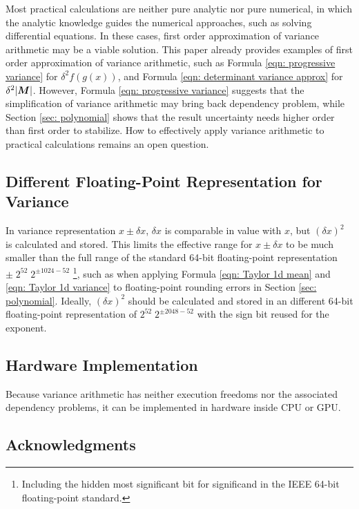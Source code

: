 \documentclass[twoside]{article}
\numberwithin{equation}{section}
\begin{document}
Most practical calculations are neither pure analytic nor pure numerical, in which the analytic knowledge guides the numerical approaches, such as solving differential equations.
In these cases, first order approximation of variance arithmetic may be a viable solution.
This paper already provides examples of first order approximation of variance arithmetic, such as Formula \eqref{eqn: progressive variance} for $\delta^2 f(g(x))$, and Formula \eqref{eqn: determinant variance approx} for $\delta^2 |\protect{\textrm{\boldmath $M$}}|$.
However, Formula \eqref{eqn: progressive variance} suggests that the simplification of variance arithmetic may bring back dependency problem, while Section \ref{sec: polynomial} shows that the result uncertainty needs higher order than first order to stabilize.
How to effectively apply variance arithmetic to practical calculations remains an open question.



\subsection{Different Floating-Point Representation for Variance}

In variance representation $x \pm \delta x$, $\delta x$ is comparable in value with $x$, but $(\delta x)^2$ is calculated and stored.
This limits the effective range for $x \pm \delta x$ to be much smaller than the full range of the standard 64-bit floating-point representation $\pm\; 2^{52} \; 2^{\pm 1024 - 52}$ \footnote{Including the hidden most significant bit for significand in the IEEE 64-bit floating-point standard.}, such as when applying Formula \eqref{eqn: Taylor 1d mean} and \eqref{eqn: Taylor 1d variance} to floating-point rounding errors in Section \ref{sec: polynomial}.
Ideally, $(\delta x)^2$ should be calculated and stored in an different 64-bit floating-point representation of $2^{52} \; 2^{\pm 2048 - 52}$ with the sign bit reused for the exponent.


\subsection{Hardware Implementation}

Because variance arithmetic has neither execution freedoms nor the associated dependency problems, it can be implemented in hardware inside CPU or GPU.



\subsection{Acknowledgments}
\end{document}
